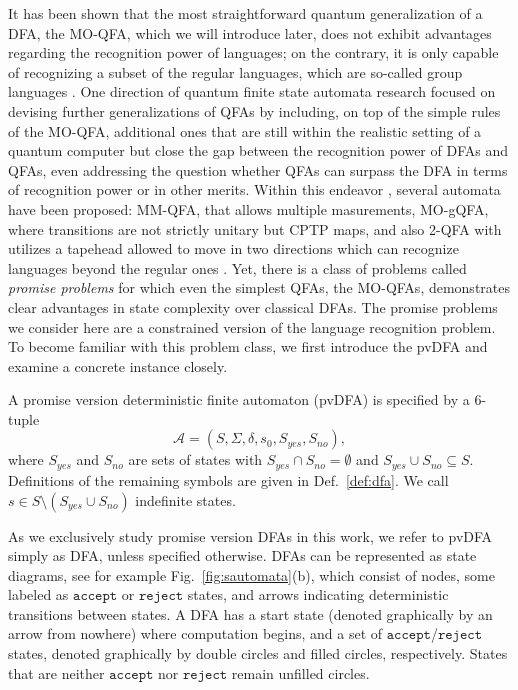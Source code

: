 \documentclass[../main.tex]{subfiles}
\begin{document}
It has been shown that the most straightforward quantum generalization of a \ac{DFA}, the \ac{MO-QFA}, which we will introduce later, does not exhibit advantages regarding the recognition power of languages; on the contrary, it is only capable of recognizing a subset of the regular languages, which are so-called group languages \cite{brodsky1999characterizations}. One direction of quantum finite state automata research focused on devising further generalizations of \acp{QFA} by including, on top of the simple rules of the \ac{MO-QFA}, additional ones that are still within the realistic setting of a quantum computer but close the gap between the recognition power of \acp{DFA} and \acp{QFA}, even addressing the question whether \acp{QFA} can surpass the \ac{DFA} in terms of recognition power or in other merits. Within this endeavor \cite{ambainis2006algebraic,brodsky1999characterizations, li2009characterizations,}, several automata have been proposed: \ac{MM-QFA}, that allows multiple masurements, \ac{MO-gQFA}, where transitions are not strictly unitary but \ac{CPTP} maps, and also \ac{2-QFA} with utilizes a tapehead allowed to move in two directions which can recognize languages beyond the regular ones \cite{li2009characterizations}. Yet, there is a class of problems called \textit{promise problems} for which even the simplest \acp{QFA}, the \acp{MO-QFA}, demonstrates clear advantages in state complexity over classical \acp{DFA}. The promise problems we consider here are a constrained version of the language recognition problem. To become familiar with this problem class, we first introduce the \ac{pvDFA} and examine a concrete instance closely. 
\begin{definition}
    A promise version deterministic finite automaton (pvDFA) is specified by a 6-tuple 
    \begin{equation}
        \mathcal{A} = (S, \Sigma, \delta, s_0, S_{yes}, S_{no}),
    \end{equation} where $S_{yes}$ and  $S_{no}$ are sets of states with $S_{yes} \cap S_{no} = \emptyset$ and $S_{yes} \cup S_{no} \subseteq S$. Definitions of the remaining symbols are given in Def.~\ref{def:dfa}. We call $s \in S \setminus (S_{yes}\cup S_{no})$ indefinite states.
\end{definition}
As we exclusively study promise version DFAs in this work, we refer to \ac{pvDFA} simply as \ac{DFA}, unless specified otherwise.
\acp{DFA} can be represented as state diagrams, see for example Fig.~\ref{fig:sautomata}(b), which consist of nodes, some labeled as $\mathtt{accept}$ or $\mathtt{reject}$  states, and arrows indicating deterministic transitions between states. A \ac{DFA} has a start state (denoted graphically by an arrow from nowhere) where computation begins, and a set of $\mathtt{accept}$/$\mathtt{reject}$  states, denoted graphically by double circles and filled circles, respectively. States that are neither $\mathtt{accept}$ nor $\mathtt{reject}$  remain unfilled circles.
\end{document}
